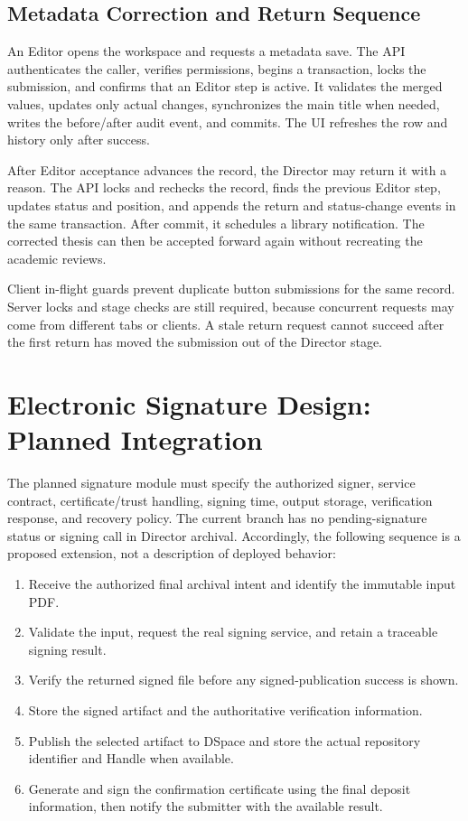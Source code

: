 \documentclass[11pt,a4paper]{report}
\begin{document}
\subsection{Metadata Correction and Return Sequence}
An Editor opens the workspace and requests a metadata save. The API authenticates the caller, verifies permissions, begins a transaction, locks the submission, and confirms that an Editor step is active. It validates the merged values, updates only actual changes, synchronizes the main title when needed, writes the before/after audit event, and commits. The UI refreshes the row and history only after success.

After Editor acceptance advances the record, the Director may return it with a reason. The API locks and rechecks the record, finds the previous Editor step, updates status and position, and appends the return and status-change events in the same transaction. After commit, it schedules a library notification. The corrected thesis can then be accepted forward again without recreating the academic reviews.

Client in-flight guards prevent duplicate button submissions for the same record. Server locks and stage checks are still required, because concurrent requests may come from different tabs or clients. A stale return request cannot succeed after the first return has moved the submission out of the Director stage.

\section{Electronic Signature Design: Planned Integration}
\label{sec:sign-design}
The planned signature module must specify the authorized signer, service contract, certificate/trust handling, signing time, output storage, verification response, and recovery policy. The current branch has no pending-signature status or signing call in Director archival. Accordingly, the following sequence is a proposed extension, not a description of deployed behavior:
\begin{enumerate}
  \item Receive the authorized final archival intent and identify the immutable input PDF.
  \item Validate the input, request the real signing service, and retain a traceable signing result.
  \item Verify the returned signed file before any signed-publication success is shown.
  \item Store the signed artifact and the authoritative verification information.
  \item Publish the selected artifact to DSpace and store the actual repository identifier and Handle when available.
  \item Generate and sign the confirmation certificate using the final deposit information, then notify the submitter with the available result.
\end{enumerate}
\end{document}

